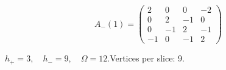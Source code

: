 \begin{minipage}{\linewidth}
\begin{minipage}[c]{0.495\linewidth}
\end{minipage}%
\begin{minipage}[c]{0.495\linewidth}\centering\fontsize{9.7}{12}\selectfont
\setlength{\abovedisplayskip}{4pt}\setlength{\belowdisplayskip}{4pt}
\setlength{\abovedisplayshortskip}{4pt}\setlength{\belowdisplayshortskip}{4pt}
\setlength{\arraycolsep}{3pt}\renewcommand{\arraystretch}{1.08}
\[A_{-}(1)=\begin{pmatrix}2 & 0 & 0 & -2\\0 & 2 & -1 & 0\\0 & -1 & 2 & -1\\-1 & 0 & -1 & 2\end{pmatrix}\]
\end{minipage}%
\par\smallskip\noindent\small $h_+=3,\quad h_-=9,\quad \Omega=12.$\quad Vertices per slice: 9.
\end{minipage}\par\vfill
